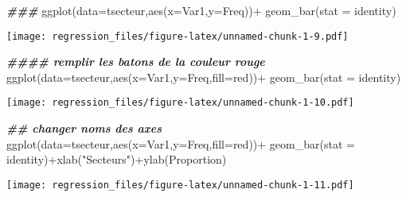\documentclass[
]{article}
\newenvironment{Shaded}{\begin{snugshade}}{\end{snugshade}}
\newcommand{\AttributeTok}[1]{\textcolor[rgb]{0.77,0.63,0.00}{#1}}
\newcommand{\DocumentationTok}[1]{\textcolor[rgb]{0.56,0.35,0.01}{\textbf{\textit{#1}}}}
\newcommand{\FunctionTok}[1]{\textcolor[rgb]{0.00,0.00,0.00}{#1}}
\newcommand{\NormalTok}[1]{#1}
\newcommand{\SpecialCharTok}[1]{\textcolor[rgb]{0.00,0.00,0.00}{#1}}
\newcommand{\StringTok}[1]{\textcolor[rgb]{0.31,0.60,0.02}{#1}}
\begin{document}
\begin{Shaded}
\begin{Highlighting}[]
\DocumentationTok{\#\#\#}
\FunctionTok{ggplot}\NormalTok{(}\AttributeTok{data=}\NormalTok{tsecteur,}\FunctionTok{aes}\NormalTok{(}\AttributeTok{x=}\NormalTok{Var1,}\AttributeTok{y=}\NormalTok{Freq))}\SpecialCharTok{+}
  \FunctionTok{geom\_bar}\NormalTok{(}\AttributeTok{stat =} \StringTok{\textquotesingle{}identity\textquotesingle{}}\NormalTok{)}
\end{Highlighting}
\end{Shaded}

\texttt{[image: regression\_files/figure-latex/unnamed-chunk-1-9.pdf]}

\begin{Shaded}
\begin{Highlighting}[]
\DocumentationTok{\#\#\#\# remplir les batons de la couleur rouge}
\FunctionTok{ggplot}\NormalTok{(}\AttributeTok{data=}\NormalTok{tsecteur,}\FunctionTok{aes}\NormalTok{(}\AttributeTok{x=}\NormalTok{Var1,}\AttributeTok{y=}\NormalTok{Freq,}\AttributeTok{fill=}\StringTok{\textquotesingle{}red\textquotesingle{}}\NormalTok{))}\SpecialCharTok{+}
  \FunctionTok{geom\_bar}\NormalTok{(}\AttributeTok{stat =} \StringTok{\textquotesingle{}identity\textquotesingle{}}\NormalTok{)}
\end{Highlighting}
\end{Shaded}

\texttt{[image: regression\_files/figure-latex/unnamed-chunk-1-10.pdf]}

\begin{Shaded}
\begin{Highlighting}[]
\DocumentationTok{\#\# changer noms des axes}
\FunctionTok{ggplot}\NormalTok{(}\AttributeTok{data=}\NormalTok{tsecteur,}\FunctionTok{aes}\NormalTok{(}\AttributeTok{x=}\NormalTok{Var1,}\AttributeTok{y=}\NormalTok{Freq,}\AttributeTok{fill=}\StringTok{\textquotesingle{}red\textquotesingle{}}\NormalTok{))}\SpecialCharTok{+}
  \FunctionTok{geom\_bar}\NormalTok{(}\AttributeTok{stat =} \StringTok{\textquotesingle{}identity\textquotesingle{}}\NormalTok{)}\SpecialCharTok{+}\FunctionTok{xlab}\NormalTok{(}\StringTok{"Secteurs"}\NormalTok{)}\SpecialCharTok{+}\FunctionTok{ylab}\NormalTok{(}\StringTok{\textquotesingle{}Proportion\textquotesingle{}}\NormalTok{)}
\end{Highlighting}
\end{Shaded}

\texttt{[image: regression\_files/figure-latex/unnamed-chunk-1-11.pdf]}
\end{document}
